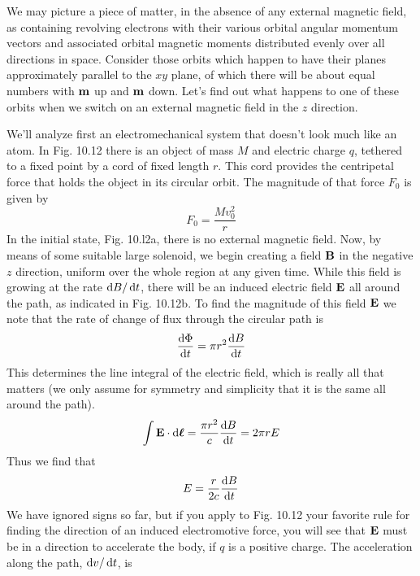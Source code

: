 
We may picture a piece of matter, in the absence of any external
magnetic field, as containing revolving electrons with their various
orbital angular momentum vectors and associated orbital magnetic
moments distributed evenly over all directions in space. Consider
those orbits which happen to have their planes approximately parallel
to the $xy$ plane, of which there will be about equal numbers with
$\mathbf{m}$ up and $\mathbf{m}$ down. Let's find out what happens to one of these orbits
when we switch on an external magnetic field in the $z$ direction.

We'll analyze first an electromechanical system that doesn't look
much like an atom. In Fig. 10.12 there is an object of mass $M$ and
electric charge $q$, tethered to a fixed point by a cord of fixed length $r$.
This cord provides the centripetal force that holds the object in its
circular orbit. The magnitude of that force $F_0$ is given by
\begin{equation}
  F_0 = \frac{M v_0^2}{r}
\end{equation}
In the initial state, Fig. 10.l2a, there is no external magnetic field.
Now, by means of some suitable large solenoid, we begin creating
a field $\mathbf{B}$ in the negative $z$ direction, uniform over the whole region
at any given time. While this field is growing at the rate $\operatorname{d\!} B/\operatorname{d\!} t$, there
will be an induced electric field $\mathbf{E}$ all around the path, as indicated in
Fig. 10.12b. To find the magnitude of this field $\mathbf{E}$ we note that the
rate of change of flux through the circular path is
\begin{equation}
  \frac{\operatorname{d\!}\Phi}{\operatorname{d\!} t} = \pi r^2\frac{\operatorname{d\!} B}{\operatorname{d\!} t}
\end{equation}
This determines the line integral of the electric field, which is really all
that matters (we only assume for symmetry and simplicity that it
is the same all around the path).
\begin{equation}
  \int \mathbf{E}\cdot\operatorname{d\!}\boldsymbol{\ell} = \frac{\pi r^2}{c} \frac{\operatorname{d\!} B}{\operatorname{d\!} t} = 2\pi r E
\end{equation}
Thus we find that
\begin{equation}
  E = \frac{r}{2c}\frac{\operatorname{d\!} B}{\operatorname{d\!} t}
\end{equation}
We have ignored signs so far, but if you apply to Fig. 10.12 your
favorite rule for finding the direction of an induced electromotive
force, you will see that $\mathbf{E}$ must be in a direction to accelerate the body,
if $q$ is a positive charge. The acceleration along the path, $\operatorname{d\!} v/\operatorname{d\!} t$, is
